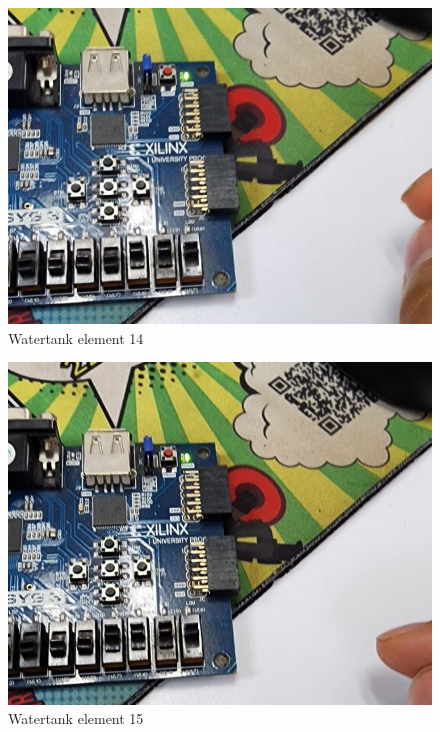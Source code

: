 \documentclass{article}
\begin{document}
\begin{multicols}{2}
	\begin{figure}[H]
		\centering
		\includegraphics[width=1\linewidth]{images/diagrams/watertank/watertank14.jpg}
		\caption{Watertank element 14}
		\label{Watertank element 14 Apendix}
	\end{figure}

	\begin{figure}[H]
		\centering
		\includegraphics[width=1\linewidth]{images/diagrams/watertank/watertank15.jpg}
		\caption{Watertank element 15}
		\label{Watertank element 15 Apendix}
	\end{figure}


\end{multicols}
\end{document}
